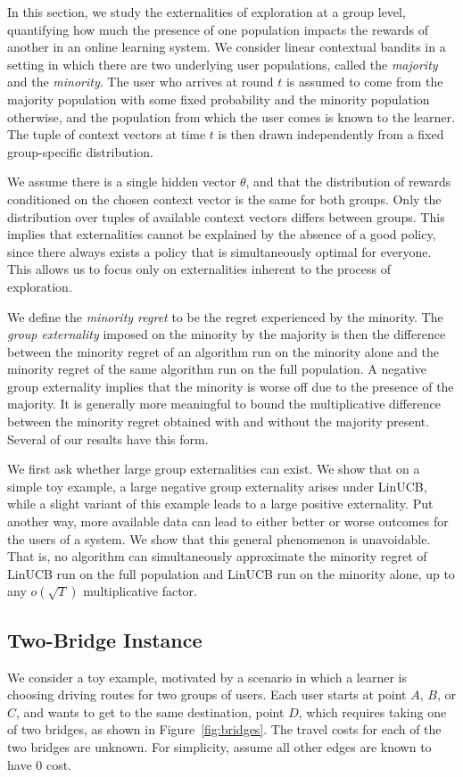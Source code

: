
In this section, we study the externalities of exploration at a group
level, quantifying how much the presence of one population impacts the
rewards of another in an online learning system. We consider linear
contextual bandits in a setting in which there are two underlying user
populations, called the \emph{majority} and the \emph{minority}. The
user who arrives at round $t$ is assumed to come from the majority
population with some fixed probability and the minority population
otherwise, and the population from which the user comes is known to
the learner. The tuple of context vectors at time $t$ is then drawn
independently from a fixed group-specific distribution.

We assume there is a
single hidden vector $\theta$, and that the distribution of rewards conditioned
on the chosen context vector is
the same for both groups. Only the distribution over tuples of
available context vectors differs between groups. This implies that
externalities cannot be explained by the absence of a good policy,
since there always exists a policy that is simultaneously optimal for
everyone. This allows us to focus only on externalities inherent to the
process of exploration.

We define the \emph{minority regret} to be the regret experienced by
the minority. The \emph{group
  externality} imposed on the minority by the majority is then the
difference between the minority regret of an algorithm run on the
minority alone and the minority regret of the same algorithm run on
the full population. A negative group externality implies that the
minority is worse off due to the presence of the majority.
It is generally more meaningful to bound the multiplicative
difference between the minority regret obtained with and without the
majority present. Several of our results have this form. 

We first ask whether large group externalities can exist. We show that
on a simple toy example, a large negative group externality arises
under LinUCB, while a slight variant of this example leads to a large
positive externality. Put another way, more available data can lead to
either better or worse outcomes for the users of a system. We show
that this general phenomenon is unavoidable. That is, no algorithm can
simultaneously approximate the minority regret of LinUCB run on the
full population and LinUCB run on the minority alone, up to any
$o(\sqrt{T})$ multiplicative factor.

\subsection{Two-Bridge Instance}
We consider a toy example, motivated by a scenario in which a learner
is choosing driving routes for two groups of users. Each user starts
at point $A$, $B$, or $C$, and wants to get to the same destination,
point $D$, which requires taking one of two bridges, as shown in
Figure~\ref{fig:bridges}. The travel costs for each of the two bridges
are unknown. For simplicity, assume all other edges are known to have
0 cost.

